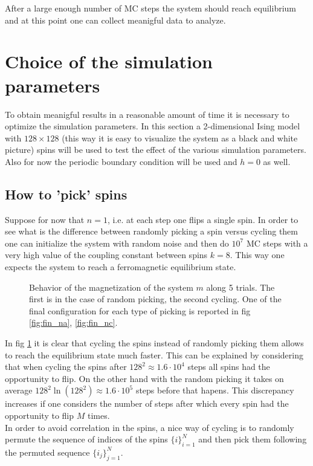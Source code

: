 \documentclass[a4paper, 11pt]{article}
\begin{document}
    After a large enough number of MC steps the system should reach equilibrium and at this point one can collect meanigful data to analyze.


  \section{Choice of the simulation parameters}
    To obtain meanigful results in a reasonable amount of time it is necessary to optimize the simulation parameters. In this section a 2-dimensional Ising model with $128 \times 128$ (this way it is easy to visualize the system as a black and white picture) spins will be used to test the effect of the various simulation parameters.
    Also for now the periodic boundary condition will be used and $h = 0$ as well.

    \subsection{How to 'pick' spins}
      Suppose for now that $n = 1$, i.e. at each step one flips a single spin. In order to see what is the difference between randomly picking a spin versus cycling them one can initialize the system with random noise and then do $10^7$ MC steps with a very high value of the coupling constant between spins $k = 8$. This way one expects the system to reach a ferromagnetic equilibrium state.

      \begin{figure}[H]
        \centering
         \quad
        \caption{Behavior of the magnetization of the system $m$ along 5 trials. The first is in the case of random picking, the second cycling. One of the final configuration for each type of picking is reported in fig \ref{fig:fin_na}, \ref{fig:fin_nc}.}
        \label{fig:pick_m}
      \end{figure}

      In fig \ref{fig:pick_m} it is clear that cycling the spins instead of randomly picking them allows to reach the equilibrium state much faster. This can be explained by considering that when cycling the spins after $128^2 \approx 1.6\cdot10^4$ steps all spins had the opportunity to flip. On the other hand with the random picking it takes on average $128^2 \ln (128^2) \approx 1.6\cdot10^5$ steps before that hapens. This discrepancy increases if one considers the number of steps after which every spin had the opportunity to flip $M$ times.\\
      In order to avoid correlation in the spins, a nice way of cycling is to randomly permute the sequence of indices of the spins $\{i\}_{i=1}^N$ and then pick them following the permuted sequence $\{i_j\}_{j=1}^N$.
\end{document}
